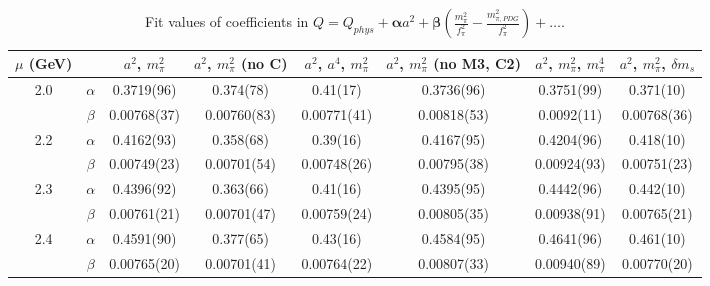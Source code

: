 \documentclass[12pt]{extarticle}
\begin{document}
\begin{table}[h!]
\begin{center}
\begin{tabular}{|c c|c|c|c|c|c|c|}
\hline
$\mu$ (GeV) &  & $a^2$, $m_\pi^2$& $a^2$, $m_\pi^2$ (no C)& $a^2$, $a^4$, $m_\pi^2$& $a^2$, $m_\pi^2$ (no M3, C2)& $a^2$, $m_\pi^2$, $m_\pi^4$& $a^2$, $m_\pi^2$, $\delta m_s$\\
\hline
\multirow{2}{0.5in}{2.0} & $\alpha$ & 0.3719(96)& 0.374(78)& 0.41(17)& 0.3736(96)& 0.3751(99)& 0.371(10)\\
 & $\beta$ & 0.00768(37)& 0.00760(83)& 0.00771(41)& 0.00818(53)& 0.0092(11)& 0.00768(36)\\
\hline
\multirow{2}{0.5in}{2.2} & $\alpha$ & 0.4162(93)& 0.358(68)& 0.39(16)& 0.4167(95)& 0.4204(96)& 0.418(10)\\
 & $\beta$ & 0.00749(23)& 0.00701(54)& 0.00748(26)& 0.00795(38)& 0.00924(93)& 0.00751(23)\\
\hline
\multirow{2}{0.5in}{2.3} & $\alpha$ & 0.4396(92)& 0.363(66)& 0.41(16)& 0.4395(95)& 0.4442(96)& 0.442(10)\\
 & $\beta$ & 0.00761(21)& 0.00701(47)& 0.00759(24)& 0.00805(35)& 0.00938(91)& 0.00765(21)\\
\hline
\multirow{2}{0.5in}{2.4} & $\alpha$ & 0.4591(90)& 0.377(65)& 0.43(16)& 0.4584(95)& 0.4641(96)& 0.461(10)\\
 & $\beta$ & 0.00765(20)& 0.00701(41)& 0.00764(22)& 0.00807(33)& 0.00940(89)& 0.00770(20)\\
\hline
\end{tabular}
\caption{Fit values of coefficients in $Q = Q_{phys} + \mathbf{\alpha} a^2 + \mathbf{\beta}\left(\frac{m_\pi^2}{f_\pi^2}-\frac{m_{\pi,PDG}^2}{f_\pi^2}\right) + \ldots$.}
\end{center}
\end{table}
























\clearpage
\end{document}
